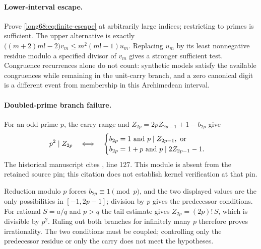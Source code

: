 \documentclass[11pt]{article}
\newcommand{\Ser}{S}
\begin{document}
\paragraph{Lower-interval escape.}
Prove \eqref{long68:eq:finite-escape} at arbitrarily large indices; restricting to
primes is sufficient.  The upper alternative is exactly
$\bigl((m+2)m!-2\bigr)v_m\le m^2(m!-1)u_m$.  Replacing $u_m$ by its least
nonnegative residue modulo a specified divisor of $v_m$ gives a stronger
sufficient test.  Congruence recurrences alone do not count: synthetic models
satisfy the available congruences while remaining in the unit-carry branch,
and a zero canonical digit is a different event from membership in this
Archimedean interval.

\paragraph{Doubled-prime branch failure.}
For an odd prime $p$, the carry range and $Z_{2p}=2pZ_{2p-1}+1-b_{2p}$ give
\begin{equation}\label{long68:eq:doubled-prime}
 p^2\mid Z_{2p}
 \quad\Longleftrightarrow\quad
 \begin{cases}
 b_{2p}=1\ \hbox{and}\ p\mid Z_{2p-1},\ \hbox{or}\\
 b_{2p}=1+p\ \hbox{and}\ p\mid2Z_{2p-1}-1 .
 \end{cases}
\end{equation}
  The historical manuscript cites , line 127. This module is absent from the retained source pin; this citation does not establish kernel verification at that pin.

Reduction modulo $p$ forces $b_{2p}\equiv1\pmod p$, and the two displayed
values are the only possibilities in $[-1,2p-1]$; division by $p$ gives the
predecessor conditions.  For rational $\Ser=a/q$ and $p>q$ the tail estimate
gives $Z_{2p}=(2p)!\,\Ser$, which is divisible by $p^2$.  Ruling out both
branches for infinitely many $p$ therefore proves irrationality.  The two
conditions must be coupled; controlling only the predecessor residue or only
the carry does not meet the hypotheses.
\end{document}
